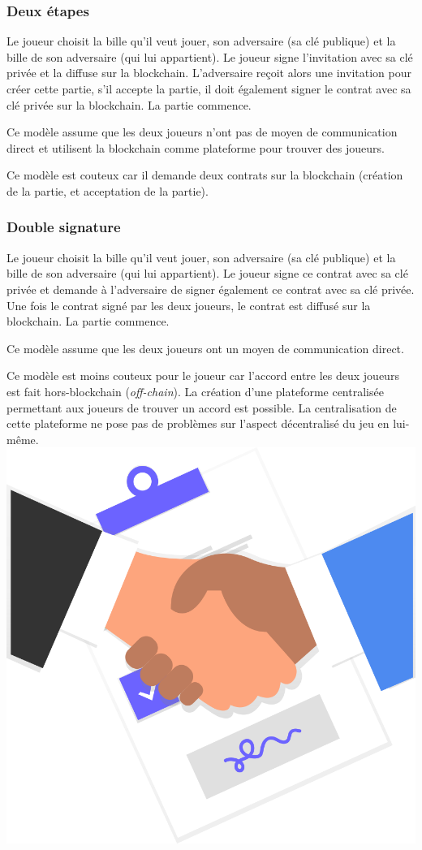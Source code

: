 \documentclass{article}
\begin{document}
\subsubsection{Deux étapes}
Le joueur choisit la bille qu'il veut jouer, son adversaire (sa clé publique) et la bille de son adversaire (qui lui appartient). Le joueur signe l'invitation avec sa clé privée et la diffuse sur la blockchain. L'adversaire reçoit alors une invitation pour créer cette partie, s'il accepte la partie, il doit également signer le contrat avec sa clé privée sur la blockchain. La partie commence.

Ce modèle assume que les deux joueurs n'ont pas de moyen de communication direct et utilisent la blockchain comme plateforme pour trouver des joueurs.

Ce modèle est couteux car il demande deux contrats sur la blockchain (création de la partie, et acceptation de la partie).


\subsubsection{Double signature}
Le joueur choisit la bille qu'il veut jouer, son adversaire (sa clé publique) et la bille de son adversaire (qui lui appartient). Le joueur signe ce contrat avec sa clé privée et demande à l'adversaire de signer également ce contrat avec sa clé privée. Une fois le contrat signé par les deux joueurs, le contrat est diffusé sur la blockchain. La partie commence.

Ce modèle assume que les deux joueurs ont un moyen de communication direct.

Ce modèle est moins couteux pour le joueur car l'accord entre les deux joueurs est fait hors-blockchain (\textit{off-chain}).
La création d'une plateforme centralisée permettant aux joueurs de trouver un accord est possible. La centralisation de cette plateforme ne pose pas de problèmes sur l'aspect décentralisé du jeu en lui-même.\\


\includegraphics[width=0.3\linewidth]{assets/agreement.png}\\
\end{document}

